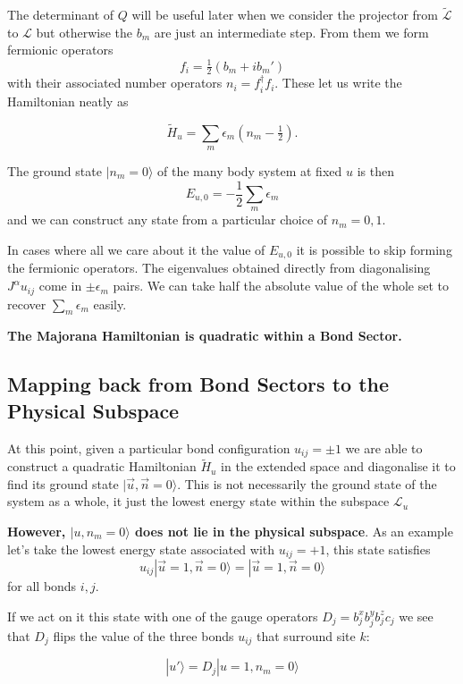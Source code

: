 The determinant of \(Q\) will be useful later when we consider the
projector from \(\mathcal{\tilde{L}}\) to \(\mathcal{L}\) but otherwise
the \(b_m\) are just an intermediate step. From them we form fermionic
operators \[ f_i = \tfrac{1}{2} (b_m + ib_m')\] with their associated
number operators \(n_i = f^\dagger_i f_i\). These let us write the
Hamiltonian neatly as

\[ \tilde{H}_u = \sum_m \epsilon_m (n_m - \tfrac{1}{2}).\]

The ground state \(|n_m = 0\rangle\) of the many body system at fixed
\(u\) is then \[E_{u,0} = -\frac{1}{2}\sum_m \epsilon_m \] and we can
construct any state from a particular choice of \(n_m = 0,1\).

In cases where all we care about it the value of \(E_{u,0}\) it is
possible to skip forming the fermionic operators. The eigenvalues
obtained directly from diagonalising \(J^{\alpha} u_{ij}\) come in
\(\pm \epsilon_m\) pairs. We can take half the absolute value of the
whole set to recover \(\sum_m \epsilon_m\) easily.

\textbf{The Majorana Hamiltonian is quadratic within a Bond Sector.}

\hypertarget{mapping-back-from-bond-sectors-to-the-physical-subspace}{%
\subsection{Mapping back from Bond Sectors to the Physical
Subspace}\label{mapping-back-from-bond-sectors-to-the-physical-subspace}}

At this point, given a particular bond configuration \(u_{ij} = \pm 1\)
we are able to construct a quadratic Hamiltonian \(\tilde{H}_u\) in the
extended space and diagonalise it to find its ground state
\(|\vec{u}, \vec{n} = 0\rangle\). This is not necessarily the ground
state of the system as a whole, it just the lowest energy state within
the subspace \(\mathcal{L}_u\)

\textbf{However, \(|u, n_m = 0\rangle\) does not lie in the physical
subspace}. As an example let's take the lowest energy state associated
with \(u_{ij} = +1\), this state satisfies
\[u_{ij} |\vec{u}=1, \vec{n} = 0\rangle = |\vec{u}=1, \vec{n} = 0\rangle\]
for all bonds \(i,j\).

If we act on it this state with one of the gauge operators
\(D_j = b_j^x b_j^y b_j^z c_j\) we see that \(D_j\) flips the value of
the three bonds \(u_{ij}\) that surround site \(k\):

\[ |u'\rangle = D_j |u=1, n_m = 0\rangle\]

